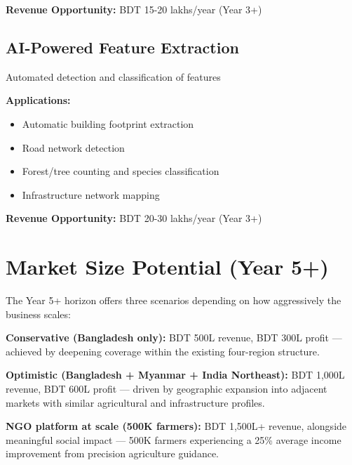 \textbf{Revenue Opportunity:} BDT 15-20 lakhs/year (Year 3+)

\subsection{AI-Powered Feature Extraction}

Automated detection and classification of features

\textbf{Applications:}
\begin{itemize}
    \item Automatic building footprint extraction
    \item Road network detection
    \item Forest/tree counting and species classification
    \item Infrastructure network mapping
\end{itemize}

\textbf{Revenue Opportunity:} BDT 20-30 lakhs/year (Year 3+)

\section{Market Size Potential (Year 5+)}

The Year 5+ horizon offers three scenarios depending on how aggressively the business scales:

\textbf{Conservative (Bangladesh only):} BDT 500L revenue, BDT 300L profit --- achieved by deepening coverage within the existing four-region structure.

\textbf{Optimistic (Bangladesh + Myanmar + India Northeast):} BDT 1,000L revenue, BDT 600L profit --- driven by geographic expansion into adjacent markets with similar agricultural and infrastructure profiles.

\textbf{NGO platform at scale (500K farmers):} BDT 1,500L+ revenue, alongside meaningful social impact --- 500K farmers experiencing a 25\% average income improvement from precision agriculture guidance.

